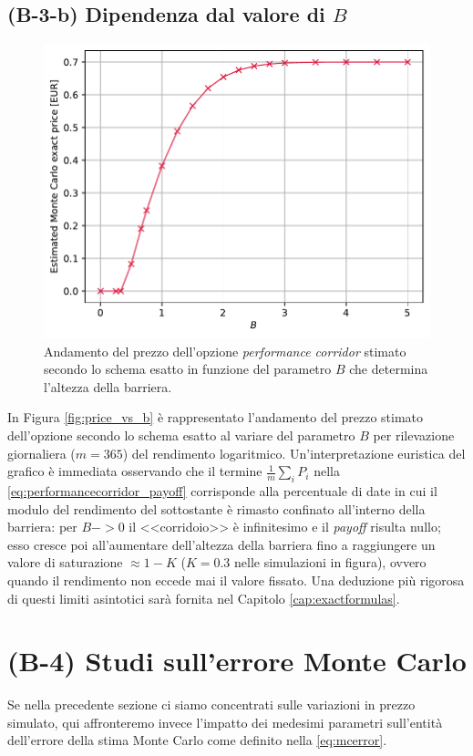 \subsection{(B-3-b) Dipendenza dal valore di $B$}

\begin{figure}[t]
    \centering
    \includegraphics[scale=0.5]{graphs/OptionPriceVsB_PriceVsB_N200mln.pdf}
    \caption{Andamento del prezzo dell'opzione \textit{performance corridor} stimato secondo lo schema esatto in funzione del parametro $B$ che determina l'altezza della barriera.}
    \label{fig:price_vs_b}
\end{figure}

In Figura \eqref{fig:price_vs_b} è rappresentato l'andamento del prezzo stimato dell'opzione secondo lo schema esatto al variare del parametro $B$ per rilevazione giornaliera ($m=365$) del rendimento logaritmico. Un'interpretazione euristica del grafico è immediata osservando che il termine $\frac{1}{m} \sum_i P_i$ nella \ref{eq:performancecorridor_payoff} corrisponde alla percentuale di date in cui il modulo del rendimento del sottostante è rimasto confinato all'interno della barriera: per $B -> 0$ il <<corridoio>> è infinitesimo e il \textit{payoff} risulta nullo; esso cresce poi all'aumentare dell'altezza della barriera fino a raggiungere un valore di saturazione $\approx 1-K$ ($K=0.3$ nelle simulazioni in figura), ovvero quando il rendimento non eccede mai il valore fissato. Una deduzione più rigorosa di questi limiti asintotici sarà fornita nel Capitolo \ref{cap:exactformulas}.


\section{(B-4) Studi sull'errore Monte Carlo} \label{sec:errorstudies}
Se nella precedente sezione ci siamo concentrati sulle variazioni in prezzo simulato, qui affronteremo invece l'impatto dei medesimi parametri sull'entità dell'errore della stima Monte Carlo come definito nella \eqref{eq:mcerror}.

